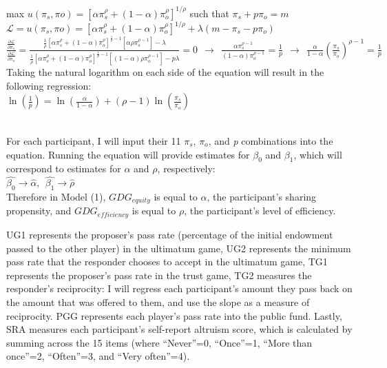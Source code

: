 \documentclass{article}
\begin{document}
{max \(u(\pi_{s}, \pi{o}) = [\alpha\pi_{s}^{\rho} + (1-\alpha)\pi_{o}^{\rho}]^{1/ \rho }\) such that \(\pi_{s} + p\pi_{o} = m\) \\

\(\mathcal{L} = u(\pi_{s}, \pi{o}) = [\alpha\pi_{s}^{\rho} + (1-\alpha)\pi_{o}^{\rho}]^{1/ \rho } + \lambda (m-\pi_{s}-p\pi_{o})\) \\

\(\frac{\frac{\partial \mathcal{L}}{\partial \pi_{s}}}{\frac{\partial \mathcal{L}}{\partial \pi_{o}}} = \frac{\frac{1}{\rho}[\alpha\pi_{s}^{\rho} + (1-\alpha)\pi_{o}^{\rho}]^{\frac{1}{\rho} -1}[\alpha\rho\pi_{s}^{\rho-1}]-\lambda}{\frac{1}{\rho}[\alpha\pi_{s}^{\rho} + (1-\alpha)\pi_{o}^{\rho}]^{\frac{1}{\rho} -1}[(1-\alpha)\rho\pi_{o}^{\rho-1}] - p\lambda} = 0 \ \ \longrightarrow \ \ \frac{\alpha\pi_{s}^{\rho-1}}{(1-\alpha)\pi_{o}^{\rho-1}} = \frac{1}{p} \ \ \longrightarrow \ \ \frac{\alpha}{1-\alpha}(\frac{\pi_{s}}{\pi_{o}})^{\rho-1} = \frac{1}{p}\) 
 \\
 
\noindent
Taking the natural logarithm on each side of the equation will result in the following regression:  \\

\indent
\( \ln(\frac{1}{p}) = \ln(\frac{\alpha}{1-\alpha})+(\rho-1)\ln(\frac{\pi_{s}}{\pi_{o}}) \)

\noindent
\\
For each participant, I will input their 11 \(\pi_{s}\), \(\pi_{o}\), and \textit{p} combinations into the equation. Running the equation will provide estimates for \(\beta_{0}\) and \(\beta_{1}\), which will correspond to estimates for \(\alpha\) and \(\rho\), respectively: \\

\(\hat{\beta_{0}} \rightarrow \hat{\alpha}, \ \  \hat{\beta_{1}} \rightarrow \hat{\rho} \) \\

Therefore in Model (1), \(GDG_{equity}\) is equal to \(\alpha\), the participant's sharing propensity, and \(GDG_{efficiency}\) is equal to \(\rho\), the participant's level of efficiency. 

UG1 represents the proposer\rq s pass rate (percentage of the initial endowment passed to the other player) in the ultimatum game, UG2 represents the minimum pass rate that the responder chooses to accept in the ultimatum game, TG1 represents the proposer\rq s pass rate in the trust game, TG2 measures the responder\rq s reciprocity: I will regress each participant's amount they pass back on the amount that was offered to them, and use the slope as a measure of reciprocity. PGG represents each player\rq s pass rate into the public fund. Lastly, SRA measures each participant\rq s self-report altruism score, which is calculated by summing across the 15 items (where ``Never''=0, ``Once''=1, ``More than once''=2, ``Often''=3, and ``Very often''=4).  

}
\end{document}
